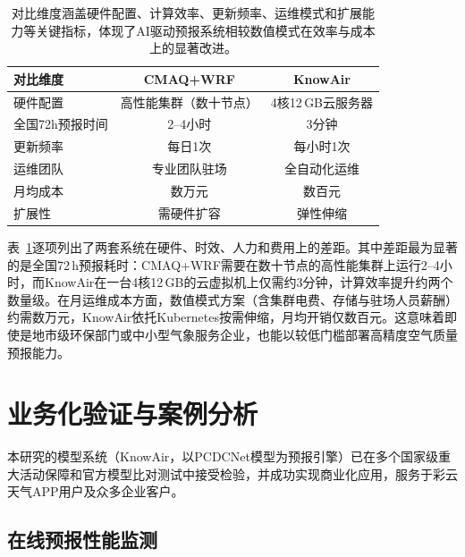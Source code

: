 \begin{table}[htbp]
    \centering
    \caption{KnowAir系统与数值模式系统的成本对比}
    \caption*{对比维度涵盖硬件配置、计算效率、更新频率、运维模式和扩展能力等关键指标，体现了AI驱动预报系统相较数值模式在效率与成本上的显著改进。}
    \label{tab:cost_comparison}
    \begin{tabular}{@{}lcc@{}}
        \toprule
        \textbf{对比维度} & \textbf{CMAQ{+}WRF} & \textbf{KnowAir} \\
        \midrule
        硬件配置 & 高性能集群（数十节点） & 4核12\,GB云服务器 \\
        全国72h预报时间 & 2--4小时 & 3分钟 \\
        更新频率 & 每日1次 & 每小时1次 \\
        运维团队 & 专业团队驻场 & 全自动化运维 \\
        月均成本 & 数万元 & 数百元 \\
        扩展性 & 需硬件扩容 & 弹性伸缩 \\
        \bottomrule
    \end{tabular}
\end{table}

表~\ref{tab:cost_comparison}逐项列出了两套系统在硬件、时效、人力和费用上的差距。其中差距最为显著的是全国72\,h预报耗时：CMAQ{+}WRF需要在数十节点的高性能集群上运行2--4小时，而KnowAir在一台4核12\,GB的云虚拟机上仅需约3分钟，计算效率提升约两个数量级。在月运维成本方面，数值模式方案（含集群电费、存储与驻场人员薪酬）约需数万元，KnowAir依托Kubernetes按需伸缩，月均开销仅数百元。这意味着即使是地市级环保部门或中小型气象服务企业，也能以较低门槛部署高精度空气质量预报能力。


\section{业务化验证与案例分析}
\label{sec:validation}

本研究的模型系统（KnowAir，以PCDCNet模型为预报引擎）已在多个国家级重大活动保障和官方模型比对测试中接受检验，并成功实现商业化应用，服务于彩云天气APP用户及众多企业客户。


\subsection{在线预报性能监测}
\label{subsec:online_monitoring}

